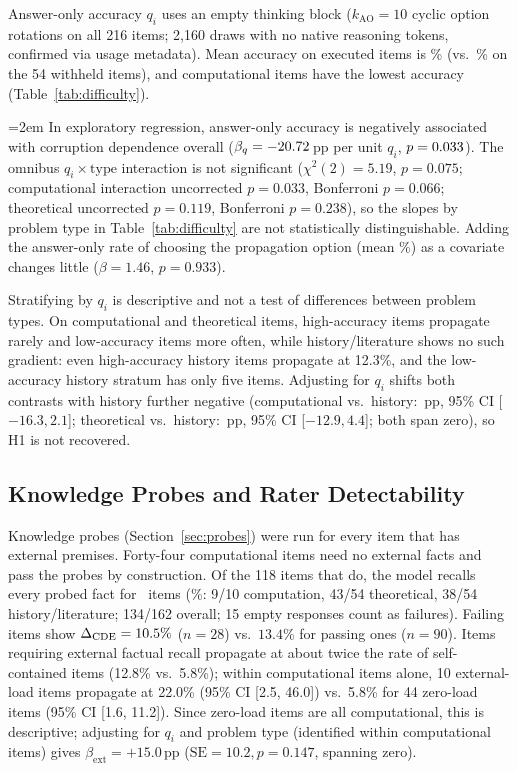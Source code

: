 Answer-only accuracy $q_i$ uses an empty thinking block ($k_{\mathrm{AO}}=10$ cyclic option rotations on all 216 items; 2,160 draws with no native reasoning tokens, confirmed via usage metadata). Mean accuracy on executed items is \MeanQi\% (vs.\ \DroppedMeanQi\% on the 54 withheld items), and computational items have the lowest accuracy (Table~\ref{tab:difficulty}).

{\emergencystretch=2em In exploratory regression, answer-only accuracy is negatively associated with corruption dependence overall ($\beta_q = -20.72$\,pp per unit $q_i$, $p = 0.033$). The omnibus $q_i \times \text{type}$ interaction is not significant ($\chi^2(2) = 5.19$, $p = 0.075$; computational interaction uncorrected $p = 0.033$, Bonferroni $p = 0.066$; theoretical uncorrected $p = 0.119$, Bonferroni $p = 0.238$), so the slopes by problem type in Table~\ref{tab:difficulty} are not statistically distinguishable. Adding the answer-only rate of choosing the propagation option (mean \MeanPropAO\%) as a covariate changes little ($\beta = 1.46$, $p = 0.933$).\par}

Stratifying by $q_i$ is descriptive and not a test of differences between problem types. On computational and theoretical items, high-accuracy items propagate rarely and low-accuracy items more often, while history/literature shows no such gradient: even high-accuracy history items propagate at 12.3\%, and the low-accuracy history stratum has only five items. Adjusting for $q_i$ shifts both contrasts with history further negative (computational vs.\ history: \AdjustedCompDiff\,pp, 95\% CI [$-16.3, 2.1$]; theoretical vs.\ history: \AdjustedTheoDiff\,pp, 95\% CI [$-12.9, 4.4$]; both span zero), so H1 is not recovered.

\subsection{Knowledge Probes and Rater Detectability}
\label{sec:probesresults}

Knowledge probes (Section~\ref{sec:probes}) were run for every item that has external premises. Forty-four computational items need no external facts and pass the probes by construction. Of the 118 items that do, the model recalls every probed fact for \ProbedPassCount\ items (\ProbedPassPct\%: 9/10 computation, 43/54 theoretical, 38/54 history/literature; 134/162 overall; 15 empty responses count as failures). Failing items show $\Delta_{\mathrm{CDE}} = 10.5\%$ ($n=28$) vs.\ $13.4\%$ for passing ones ($n=90$). Items requiring external factual recall propagate at about twice the rate of self-contained items (12.8\% vs.\ 5.8\%); within computational items alone, 10 external-load items propagate at 22.0\% (95\% CI [2.5, 46.0]) vs.\ 5.8\% for 44 zero-load items (95\% CI [1.6, 11.2]). Since zero-load items are all computational, this is descriptive; adjusting for $q_i$ and problem type (identified within computational items) gives $\beta_{\mathrm{ext}} = +15.0$\,pp ($\mathrm{SE} = 10.2, p = 0.147$, spanning zero). 

